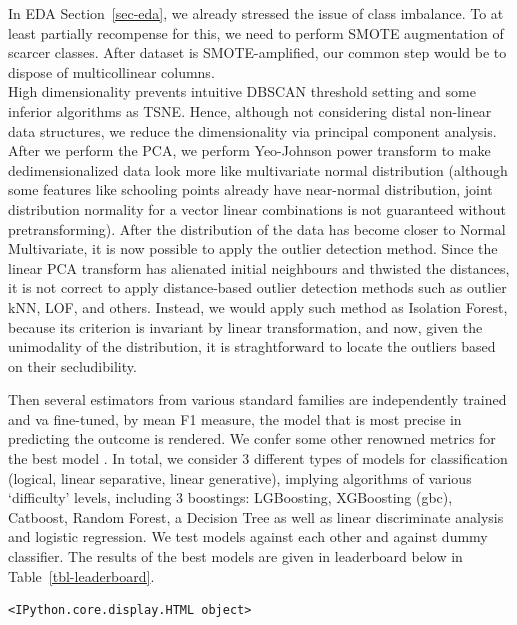 \documentclass[
  letterpaper,
  DIV=11,
  numbers=noendperiod]{scrartcl}
\begin{document}
In EDA Section~\ref{sec-eda}, we already stressed the issue of class
imbalance. To at least partially recompense for this, we need to perform
SMOTE augmentation of scarcer classes. After dataset is SMOTE-amplified,
our common step would be to dispose of multicollinear columns.\\
High dimensionality prevents intuitive DBSCAN threshold setting and some
inferior algorithms as TSNE. Hence, although not considering distal
non-linear data structures, we reduce the dimensionality via principal
component analysis. After we perform the PCA, we perform Yeo-Johnson
power transform to make dedimensionalized data look more like
multivariate normal distribution (although some features like schooling
points already have near-normal distribution, joint distribution
normality for a vector linear combinations is not guaranteed without
pretransforming). After the distribution of the data has become closer
to Normal Multivariate, it is now possible to apply the outlier
detection method. Since the linear PCA transform has alienated initial
neighbours and thwisted the distances, it is not correct to apply
distance-based outlier detection methods such as outlier kNN, LOF, and
others. Instead, we would apply such method as Isolation Forest, because
its criterion is invariant by linear transformation, and now, given the
unimodality of the distribution, it is straghtforward to locate the
outliers based on their secludibility.

Then several estimators from various standard families are independently
trained and va fine-tuned, by mean F1 measure, the model that is most
precise in predicting the outcome is rendered. We confer some other
renowned metrics for the best model . In total, we consider 3 different
types of models for classification (logical, linear separative, linear
generative), implying algorithms of various \enquote*{difficulty}
levels, including 3 boostings: LGBoosting, XGBoosting (gbc), Catboost,
Random Forest, a Decision Tree as well as linear discriminate analysis
and logistic regression. We test models against each other and against
dummy classifier. The results of the best models are given in
leaderboard below in Table~\ref{tbl-leaderboard}.

\begin{verbatim}
<IPython.core.display.HTML object>
\end{verbatim}
\end{document}
